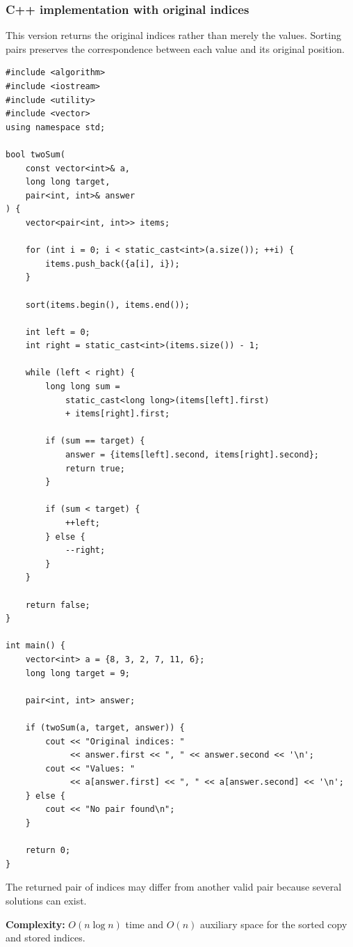 \subsubsection{C++ implementation with original indices}

This version returns the original indices rather than merely the values. Sorting pairs preserves the correspondence between each value and its original position.

\begin{lstlisting}[style=cppstyle]
#include <algorithm>
#include <iostream>
#include <utility>
#include <vector>
using namespace std;

bool twoSum(
    const vector<int>& a,
    long long target,
    pair<int, int>& answer
) {
    vector<pair<int, int>> items;

    for (int i = 0; i < static_cast<int>(a.size()); ++i) {
        items.push_back({a[i], i});
    }

    sort(items.begin(), items.end());

    int left = 0;
    int right = static_cast<int>(items.size()) - 1;

    while (left < right) {
        long long sum =
            static_cast<long long>(items[left].first)
            + items[right].first;

        if (sum == target) {
            answer = {items[left].second, items[right].second};
            return true;
        }

        if (sum < target) {
            ++left;
        } else {
            --right;
        }
    }

    return false;
}

int main() {
    vector<int> a = {8, 3, 2, 7, 11, 6};
    long long target = 9;

    pair<int, int> answer;

    if (twoSum(a, target, answer)) {
        cout << "Original indices: "
             << answer.first << ", " << answer.second << '\n';
        cout << "Values: "
             << a[answer.first] << ", " << a[answer.second] << '\n';
    } else {
        cout << "No pair found\n";
    }

    return 0;
}
\end{lstlisting}

The returned pair of indices may differ from another valid pair because several solutions can exist.

\textbf{Complexity:} $O(n\log n)$ time and $O(n)$ auxiliary space for the sorted copy and stored indices.

